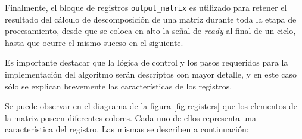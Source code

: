 Finalmente, el bloque de registros \verb;output_matrix; es utilizado para retener el resultado del cálculo de descomposición de una matriz durante toda la etapa de procesamiento, desde que se coloca en alto la señal de \textit{ready} al final de un ciclo, hasta que ocurre el mismo suceso en el siguiente.

Es importante destacar que la lógica de control y los pasos requeridos para la implementación del algoritmo serán descriptos con mayor detalle, y en este caso sólo se explican brevemente las características de los registros.

Se puede observar en el diagrama de la figura \ref{fig:registers} que los elementos de la matriz poseen diferentes colores. Cada uno de ellos representa una característica del registro. Las mismas se describen a continuación:


